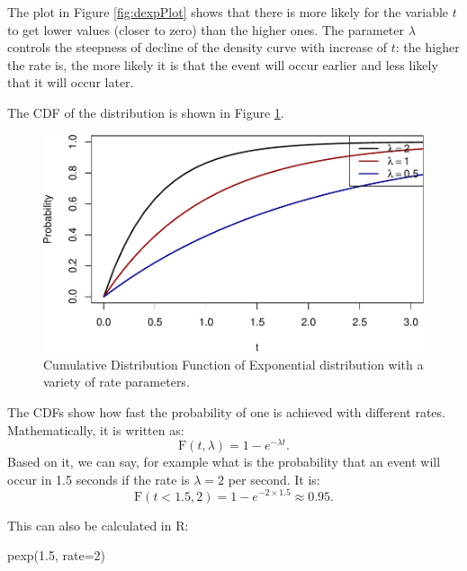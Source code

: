 \documentclass[
]{book}
\newenvironment{Shaded}{\begin{snugshade}}{\end{snugshade}}
\newcommand{\AttributeTok}[1]{\textcolor[rgb]{0.77,0.63,0.00}{#1}}
\newcommand{\DecValTok}[1]{\textcolor[rgb]{0.00,0.00,0.81}{#1}}
\newcommand{\FloatTok}[1]{\textcolor[rgb]{0.00,0.00,0.81}{#1}}
\newcommand{\FunctionTok}[1]{\textcolor[rgb]{0.00,0.00,0.00}{#1}}
\newcommand{\NormalTok}[1]{#1}
\theoremstyle{definition}
\theoremstyle{definition}
\theoremstyle{definition}
\theoremstyle{definition}
\theoremstyle{remark}
\begin{document}
The plot in Figure \ref{fig:dexpPlot} shows that there is more likely for the variable \(t\) to get lower values (closer to zero) than the higher ones. The parameter \(\lambda\) controls the steepness of decline of the density curve with increase of \(t\): the higher the rate is, the more likely it is that the event will occur earlier and less likely that it will occur later.

The CDF of the distribution is shown in Figure \ref{fig:pexpPlot}.

\begin{figure}
\centering
\includegraphics{Svetunkov---Statistics-for-Business-Analytics_files/figure-latex/pexpPlot-1.pdf}
\caption{\label{fig:pexpPlot}Cumulative Distribution Function of Exponential distribution with a variety of rate parameters.}
\end{figure}

The CDFs show how fast the probability of one is achieved with different rates. Mathematically, it is written as:
\begin{equation}
    \mathrm{F}(t, \lambda) = 1 - e^{- \lambda t}.
    \label{eq:ExponentialCDF}
\end{equation}
Based on it, we can say, for example what is the probability that an event will occur in 1.5 seconds if the rate is \(\lambda=2\) per second. It is:
\begin{equation*}
    \mathrm{F}(t < 1.5, 2) = 1 - e^{- 2 \times 1.5} \approx 0.95 .
\end{equation*}

This can also be calculated in R:

\begin{Shaded}
\begin{Highlighting}[]
\FunctionTok{pexp}\NormalTok{(}\FloatTok{1.5}\NormalTok{, }\AttributeTok{rate=}\DecValTok{2}\NormalTok{)}
\end{Highlighting}
\end{Shaded}
\end{document}
